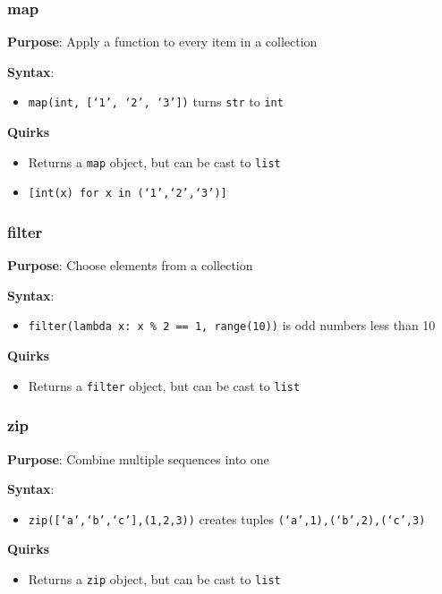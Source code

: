\documentclass{beamer}
\begin{document}
\begin{frame}
  \frametitle{map}

  \textbf{Purpose}: Apply a function to every item in a collection

  \textbf{Syntax}: 
  \begin{itemize}
    \item \texttt{map(int, [`1', `2', `3'])} turns \texttt{str} to \texttt{int}
  \end{itemize}

  \textbf{Quirks}
  \begin{itemize}
    \item Returns a \texttt{map} object, but can be cast to \texttt{list}
    \item \texttt{[int(x) for x in (`1',`2',`3')]}
  \end{itemize}
\end{frame}

\begin{frame}
  \frametitle{filter}

  \textbf{Purpose}: Choose elements from a collection

  \textbf{Syntax}: 
  \begin{itemize}
    \item \texttt{filter(lambda x: x \% 2 == 1, range(10))} is odd numbers less than 10
  \end{itemize}

  \textbf{Quirks}
  \begin{itemize}
    \item Returns a \texttt{filter} object, but can be cast to \texttt{list}
  \end{itemize}
\end{frame}

\begin{frame}
  \frametitle{zip}

  \textbf{Purpose}: Combine multiple sequences into one

  \textbf{Syntax}: 
  \begin{itemize}
    \item \texttt{zip([`a',`b',`c'],(1,2,3))} creates tuples \texttt{(`a',1),(`b',2),(`c',3)}
  \end{itemize}

  \textbf{Quirks}
  \begin{itemize}
    \item Returns a \texttt{zip} object, but can be cast to \texttt{list}
  \end{itemize}
\end{frame}
\end{document}
